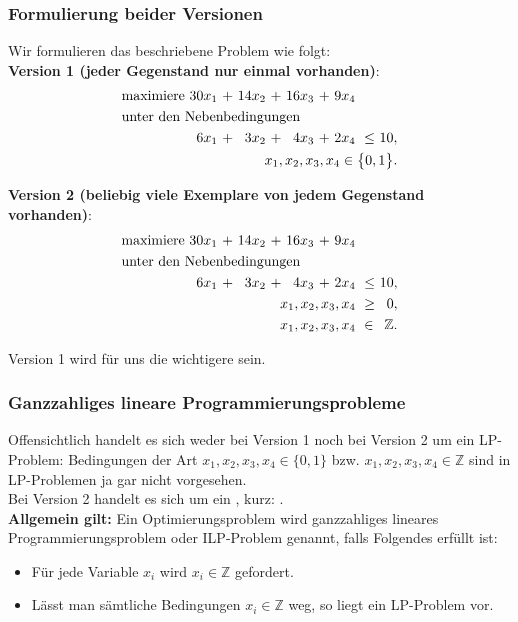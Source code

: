 \documentclass[smaller]{beamer}
\begin{document}
\begin{frame}
 \frametitle{Formulierung beider Versionen}
 Wir formulieren das beschriebene Problem wie folgt: \\ \vspace*{0.2cm}
\textbf{Version 1 ({\glqq}jeder Gegenstand nur einmal vorhanden{\grqq})}:
\begin{align*}
\begin{alignedat}{6}
& \text{maximiere } & 30x_1 &\ + &\ 14x_2 &\ + &\ 16x_3 &\ + &\ 9x_4 \\
& \rlap{unter den Nebenbedingungen} & & & & & & & \\
&& 6x_1 &\ + &\ 3x_2 &\ + &\ 4x_3 &\ + &\ 2x_4 &\ \leq &\ 10, \\
&& & & & & & & & & \llap{$x_1,x_2,x_3,x_4 \in \big\{ 0,1 \big\}$.}
\end{alignedat}
\end{align*}

\textbf{Version 2 ({\glqq}beliebig viele Exemplare von jedem Gegenstand vorhanden{\grqq})}:
\begin{align*}
\begin{alignedat}{6}
& \text{maximiere } & 30x_1 &\ + &\ 14x_2 &\ + &\ 16x_3 &\ + &\ 9x_4 \\
& \rlap{unter den Nebenbedingungen} & & & & & & & \\
&& 6x_1 &\ + &\ 3x_2 &\ + &\ 4x_3 &\ + &\ 2x_4 &\ \leq &\ 10, \\
&& & & & & & & \llap{$x_1,x_2,x_3,x_4$} &\ \geq &\ 0, \\
&& & & & & & & \llap{$x_1,x_2,x_3,x_4$} &\ \in &\ \mathbb{Z}.
\end{alignedat}
\end{align*}

Version 1 wird für uns die wichtigere sein.
\end{frame}

\begin{frame}
 \frametitle{Ganzzahliges lineare Programmierungsprobleme}
 \alert{Offensichtlich handelt es sich weder bei Version 1 noch bei Version 2 um ein LP-Problem}: Bedingungen der Art $x_1,x_2,x_3,x_4 \in \big\{ 0,1 \big\}$ bzw. $x_1,x_2,x_3,x_4 \in \mathbb{Z}$ sind in LP-Problemen ja gar nicht vorgesehen. \\ \vspace*{0.2cm}
Bei Version 2 handelt es sich um ein , kurz: . \\ \vspace*{0.2cm}
\textbf{Allgemein gilt:} Ein Optimierungsproblem wird \alert{ganzzahliges lineares Programmierungsproblem} oder \alert{ILP-Problem} genannt, falls Folgendes erfüllt ist:
\begin{itemize}
	\item Für jede Variable $x_i$ wird $x_i \in \mathbb{Z}$ gefordert.
	\item Lässt man sämtliche Bedingungen $x_i \in \mathbb{Z}$ weg, so liegt ein LP-Problem vor.
\end{itemize}
\end{frame}
\end{document}
